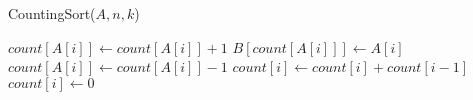 \documentclass[20pt,a4paper,landscape]{extarticle}
\begin{document}
\pagestyle{empty}
\noindent

\begin{function}[H]
	\caption{CountingSort($A,n,k$)}
	\BlankLine


	$\mathit{count}[A[i]] \leftarrow \mathit{count}[A[i]] + 1$\;
	$B[\mathit{count}[A[i]]] \leftarrow A[i]$ \;
	$\mathit{count}[A[i]] \leftarrow \mathit{count}[A[i]] - 1$ \;
	$\mathit{count}[i] \leftarrow \mathit{count}[i] + \mathit{count}[i - 1]$ \;
	$\mathit{count}[i] \leftarrow 0$ \;

\end{function}
\end{document}
